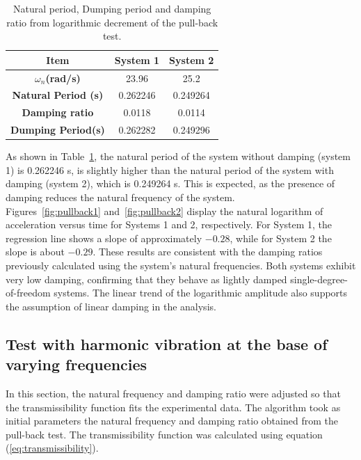\documentclass{article}  %
\begin{document}
\newpage

\begin{table}[h]
\centering
  \begin{tabular}{|c|c|c|}
  \hline
  \textbf{Item}& \textbf{System 1}& \textbf{System 2} \\ \hline
  \textbf{$\omega_n$(rad/s)} & 23.96 & 25.2  \\ \hline
  \textbf{Natural Period (s)} & 0.262246& 0.249264  \\ \hline
  \textbf{Damping ratio} & 0.0118&0.0114  \\ \hline
  \textbf{Dumping Period(s)} & 0.262282&0.249296  \\ \hline
  \end{tabular}
\caption{Natural period, Dumping period and damping ratio from logarithmic decrement of the pull-back test.}
\label{tab:pullback}
\end{table}

As shown in Table~\ref{tab:pullback}, the natural period of the system without damping (system 1) is 0.262246 s, is slightly higher than the natural period of the system with damping (system 2), which is 0.249264 s. This is expected, as the presence of damping reduces the natural frequency of the system.\\

Figures~\ref{fig:pullback1} and~\ref{fig:pullback2} display the natural logarithm of acceleration versus time for Systems 1 and 2, respectively. For System 1, the regression line shows a slope of approximately $-0.28$, while for System 2 the slope is about $-0.29$. These results are consistent with the damping ratios previously calculated using the system's natural frequencies. Both systems exhibit very low damping, confirming that they behave as lightly damped single-degree-of-freedom systems. The linear trend of the logarithmic amplitude also supports the assumption of linear damping in the analysis.

\subsection{Test with harmonic vibration at the base of varying frequencies}

In this section, the natural frequency and damping ratio were adjusted so that the transmissibility function  fits the experimental data. The algorithm took as initial parameters the natural frequency and damping ratio obtained from the pull-back test. The transmissibility function was calculated using equation (\ref{eq:transmissibility}).
\end{document}
